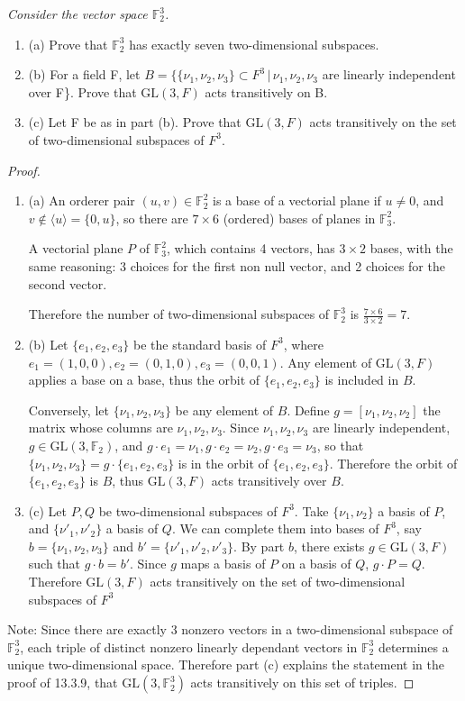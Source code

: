 \documentclass[11pt,a4paper]{article}
\newcommand{\be} {\begin{enumerate}}
\newcommand{\ee} {\end{enumerate}}
\newcommand{\F}{\mathbb{F}}
\begin{document}
{\it Consider the vector space  $\mathbb{F}_2^3$.
\be
\item[(a)] Prove that $\mathbb{F}_2^3$ has exactly seven two-dimensional subspaces.
\item[(b)] For a field F, let $B=\{\{ \nu_1,\nu_2,\nu_3\} \subset F^3\, |\,  \nu_1,\nu_2,\nu_3$ are linearly independent over F\}. Prove that $\mathrm{GL}(3,F)$ acts transitively on B.

\item[(c)] Let F be as in part (b). Prove that $\mathrm{GL}(3,F)$ acts transitively on the set of two-dimensional subspaces of $F^3$.
\ee
\begin{proof}\be
\item[(a)] An orderer pair $(u,v) \in \F_2^2$ is a base of a vectorial plane if $u \ne 0$, and $v \not \in \langle u \rangle = \{0,u\}$, so there are $7 \times 6$ (ordered) bases of planes in $\F_3^2$.

A vectorial plane $P$ of $ \F_3^2$, which contains 4 vectors, has $3 \times 2$ bases, with the same reasoning: 3 choices for the first non null vector, and 2 choices for the second vector.

Therefore the number of two-dimensional subspaces of $\F_2^3$ is $\frac{7 \times 6}{3 \times 2} = 7$.

\item[(b)] 
Let $\{e_1,e_2,e_3\}$ be the standard basis of $F^3$, where $e_1 =(1,0,0), e_2 = (0,1,0), e_3 = (0,0,1)$. Any element of $\mathrm{GL}(3,F)$ applies a base on a base, thus the orbit of $\{e_1,e_2,e_3\}$ is included in $B$.


Conversely, let $\{\nu_1,\nu_2,\nu_3\}$ be any element of $B$. Define $g = [\nu_1,\nu_2,\nu_2]$ the matrix whose columns are $\nu_1,\nu_2,\nu_3$. Since $\nu_1,\nu_2,\nu_3$ are linearly independent, $g \in \mathrm{GL}(3,\F_2)$, and $g\cdot e_1 = \nu_1, g\cdot e_2 = \nu_2,g\cdot e_3 = \nu_3$, so that $\{\nu_1,\nu_2,\nu_3\} = g\cdot\{e_1,e_2,e_3\}$ is in the orbit of $\{e_1,e_2,e_3\}$. Therefore the orbit of $\{e_1,e_2,e_3\}$ is $B$, thus $ \mathrm{GL}(3,F)$ acts transitively over $B$.


\item[(c)] Let $P,Q$ be two-dimensional subspaces of $F^3$. Take $\{\nu_1,\nu_2\}$ a basis of $P$, and $\{\nu'_1,\nu'_2\}$ a basis of $Q$. We can complete them into bases of $F^3$, say $b = \{\nu_1,\nu_2,\nu_3\}$ and $ b' = \{\nu'_1,\nu'_2,\nu'_3\}$. By part $b$, there exists $g \in  \mathrm{GL}(3,F)$ such that $g\cdot b = b'$. Since $g$ maps a basis of $P$ on a basis of $Q$, $g\cdot P = Q$. Therefore $\mathrm{GL}(3,F)$  acts transitively on the set of two-dimensional subspaces of $F^3$ 
\ee

\bigskip

Note: Since there are exactly 3 nonzero vectors in a two-dimensional subspace of $\F_2^3$, each triple of distinct nonzero linearly dependant vectors in $\F_2^3$ determines a unique two-dimensional space. Therefore part (c) explains the statement in the proof of 13.3.9, that $ \mathrm{GL}(3,\F_2^3)$ acts transitively on this set of triples.
\end{proof}
}
\end{document}
